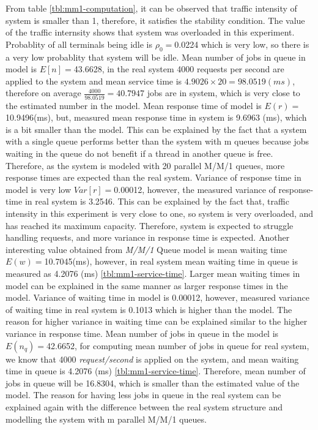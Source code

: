 \documentclass[11pt]{article}
\begin{document}
From table \ref{tbl:mm1-computation}, it can be observed that traffic intensity of system is smaller than 1, therefore,
it satisfies the stability condition. The value of the traffic internsity shows that system was overloaded 
in this experiment. Probablity of all terminals being idle is ${\rho}_0=$0.0224 which is very low, so there is 
a very low probablity that system will be idle. Mean number of jobs in queue in model is $E[n]=$43.6628, 
in the real system 4000 requests per second are applied to the system and mean service time is 
$4.9026 \times 20 = 98.0519(ms)$, therefore on average $\frac{4000}{98.0519}=40.7947$ jobs are 
in system, which is very close to the estimated number in the model. Mean response time of model 
is $E(r)=$10.9496(ms), but, measured mean response time in system is 9.6963 (ms), which
is a bit smaller than the model. This can be explained by the fact that
a system with a single queue performs better than the system with m queues because jobs waiting in the 
queue do not benefit if a thread in another queue is free. Therefore, as the system is modeled with 20 
parallel M/M/1 queues, more response times are expected than the real system. Variance of response 
time in model is very low $Var[r]=$0.00012, however, the measured variance of response-time in 
real system is 3.2546. This can be explained by the fact that, traffic intensity in this experiment
is very close to one, so system is very overloaded, and has reached its maximum capacity. Therefore,
system is expected to struggle handling requests, and more variance in response time is expected.
Another interesting value obtained from \emph{M/M/1} Queue model is mean waiting time $E(w)=$10.7045(ms), 
however, in real system mean waiting time in queue is measured as 4.2076 (ms) \ref{tbl:mm1-service-time}.
Larger mean waiting times in model can be explained in the same manner as larger response times in the model.
Variance of waiting time in model is 0.00012, however, measured variance of waiting time 
in real system is 0.1013 which is higher than the model. The reason for higher variance in waiting time
can be explained similar to the higher variance in response time. Mean number of jobs in queue
in the model is $E(n_q)=$42.6652, for computing mean number of jobs in queue for real system, 
we know that 4000 \emph{request/second} is applied on the system, and mean waiting time in queue 
is 4.2076 (ms) \ref{tbl:mm1-service-time}. Therefore, mean number of jobs in queue will be
16.8304, which is smaller than the estimated value of the model. The reason for having less 
jobs in queue in the real system can be explained again with the difference between 
the real system structure and modelling the system with m parallel M/M/1 queues.
\end{document}
